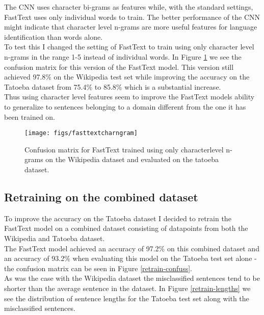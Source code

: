 The CNN uses character bi-grams as features while, with the standard settings, FastText uses only individual words to train. The better performance of the CNN might indicate that character level n-grams are more useful features for language identification than words alone.\\

To test this I changed the setting of FastText to train using only character level n-grams in the range 1-5 instead of individual words. In Figure \ref{fasttextcharngram} we see the confusion matrix for this version of the FastText model. This version still achieved 97.8\% on the Wikipedia test set while improving the accuracy on the Tatoeba dataset from 75.4\% to 85.8\% which is a substantial increase.\\

Thus using character level features seem to improve the FastText models ability to generalize to sentences belonging to a domain different from the one it has been trained on.

\begin{figure}[h!]
    \centering
    \texttt{[image: figs/fasttextcharngram]}
    \caption{Confusion matrix for FastText trained using only characterlevel n-grams on the Wikipedia dataset and evaluated on the tatoeba dataset.}
    \label{fasttextcharngram}
\end{figure}


\subsection{Retraining on the combined dataset}
To improve the accuracy on the Tatoeba dataset I decided to retrain the FastText model on a combined dataset consisting of datapoints from
both the Wikipedia and Tatoeba dataset.\\

The FastText model achieved an accuracy of 97.2\% on this combined dataset and an accuracy of 93.2\% when evaluating this model on the Tatoeba test set alone - the confusion matrix can be seen in Figure \ref{retrain-confuss}.\\

As was the case with the Wikipedia dataset the misclassified sentences tend to be shorter than the average sentence in the dataset. In Figure \ref{retrain-lengths} we see the distribution of sentence lengths for the Tatoeba test set along with the misclassified sentences.\\

